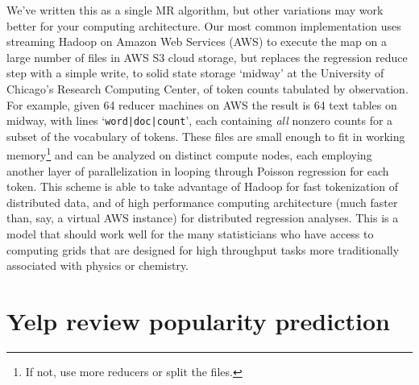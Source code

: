 \documentclass[12pt]{article}
\newcommand{\cd}[1]{{\tt#1}}
\begin{document}
We've written this as a single MR algorithm, but other variations may work better for your computing architecture. Our most common implementation uses streaming Hadoop on Amazon Web Services (AWS) to execute the map on a large number of files in AWS S3 cloud storage, but replaces the regression reduce step with a simple write, to solid state storage `midway' at the University of Chicago's Research Computing Center, of token counts tabulated by observation.  For example, given 64 reducer machines on AWS the result is 64 text tables on midway, with lines `\cd{word|doc|count}', each containing {\it all} nonzero counts for a subset of the vocabulary of tokens.  These files are small enough to fit in working memory\footnote{If not, use more reducers or split the files.} and can be analyzed on distinct compute nodes, each employing another layer of parallelization in looping through Poisson regression for each token.  This scheme is able to take advantage of Hadoop for fast tokenization of distributed data, and of
high performance computing architecture (much faster than, say, a virtual AWS instance) for distributed  regression analyses.  This is a model that should work well for the many statisticians who have access to computing grids that are designed for high throughput tasks more traditionally associated with physics or chemistry.


\section{Yelp review popularity prediction}
\label{YELP}
\end{document}
